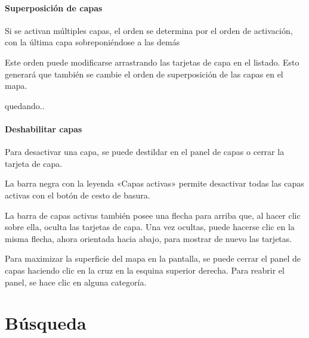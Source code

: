 \documentclass[a4paper,11pt,openany,spanish]{sphinxmanual}
\begin{document}
\paragraph{Superposición de capas}
\label{\detokenize{navigation/cards:superposicion-de-capas}}
\sphinxAtStartPar
Si se activan múltiples capas, el orden se determina por el orden de activación, con la última capa sobreponiéndose a las demás

\noindent{}

\sphinxAtStartPar
Este orden puede modificarse arrastrando las tarjetas de capa en el listado. Esto generará que también se cambie el orden de superposición de las capas en el mapa.

\noindent{}

\sphinxAtStartPar
quedando..

\noindent{}


\paragraph{Deshabilitar capas}
\label{\detokenize{navigation/cards:deshabilitar-capas}}
\sphinxAtStartPar
Para desactivar una capa, se puede destildar en el panel de capas o cerrar la tarjeta de capa.

\noindent{}

\sphinxAtStartPar
La barra negra con la leyenda «Capas activas» permite desactivar todas las capas activas con el botón de cesto de basura.

\noindent{}

\sphinxAtStartPar
La barra de capas activas también posee una flecha para arriba que, al hacer clic sobre ella, oculta las tarjetas de capa. Una vez ocultas, puede hacerse clic en la misma flecha, ahora orientada hacia abajo, para mostrar de nuevo las tarjetas.

\noindent{}

\sphinxAtStartPar
Para maximizar la superficie del mapa en la pantalla, se puede cerrar el panel de capas haciendo clic en la cruz en la esquina superior derecha. Para reabrir el panel, se hace clic en alguna categoría.

\noindent{}

\sphinxstepscope


\section{Búsqueda}
\label{\detokenize{search/index:busqueda}}\label{\detokenize{search/index::doc}}
\sphinxstepscope
\end{document}
